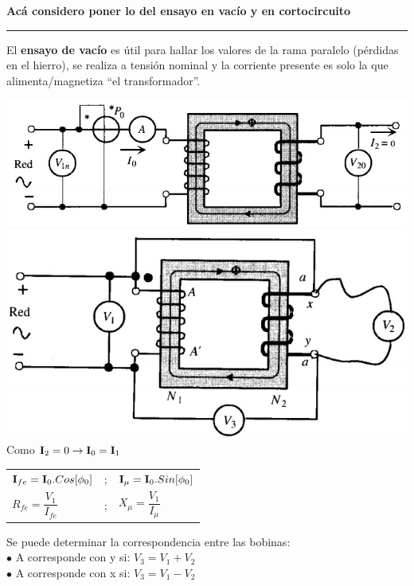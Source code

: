\documentclass[11pt,a4paper]{article}
\newcommand{\fasor}[1]{\uppercase{\textbf{#1}}}
\newcommand{\subtitulo}[1]{
	\textbf{#1} \\ \vspace{.1cm} {\color{gray} \hrule}
}
\begin{document}
\begin{cajita}
	\subtitulo{Acá considero poner lo del ensayo en vacío y en cortocircuito}	
	
	\begin{flushleft}
		El \textbf{ensayo de vacío} es útil para hallar los valores de la rama paralelo (pérdidas en el hierro), se realiza a tensión nominal y la corriente presente es solo la que alimenta/magnetiza ``el transformador''.\\
		\begin{multicols}{2}
			\includegraphics[width=.8\linewidth]{ensayo-vacio-1}\\
			\includegraphics[width=.8\linewidth]{ensayo-vacio-2}\\
			\columnbreak
			Como $\fasor{I}_{2}=0\rightarrow\fasor{I}_{0}=\fasor{I}_{1}$\\
			\vspace*{0.3cm}
			\begin{tabular}{l c l}
					$\fasor{I}_{fe}=\fasor{I}_{0}.Cos[\phi_{0}] $& ; & $\fasor{I}_{\mu}=\fasor{I}_{0}.Sin[\phi_{0}] $\\[0.2cm]
					$ R_{fe}=\dfrac{V_{1}}{I_{fe}} $& ; &$X_{\mu}=\dfrac{V_{1}}{I_{\mu}}$\\[0.4cm]
			\end{tabular}
		
			Se puede determinar la correspondencia entre las bobinas:\\
			$\bullet$ A corresponde con y si: $V_{3}=V_{1}+V_{2}$\\
			$\bullet$ A corresponde con x si: $V_{3}=V_{1}-V_{2}$\\
			
		\end{multicols}
	

\end{flushleft}
\end{cajita}
\end{document}
